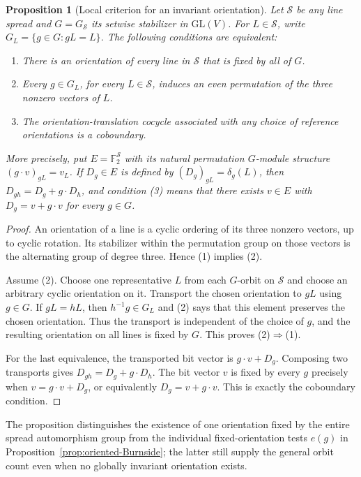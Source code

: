 \documentclass[11pt]{article}
\newtheorem{proposition}[theorem]{Proposition}
\begin{document}
\begin{proposition}[Local criterion for an invariant orientation]
\label{prop:orientation-local}
Let $\mathcal S$ be any line spread and
$G=G_{\mathcal S}$ its setwise stabilizer in $\mathrm{GL}(V)$.
For $L\in\mathcal S$, write $G_L=\{g\in G:gL=L\}$.
The following conditions are equivalent:
\begin{enumerate}
\item There is an orientation of every line in $\mathcal S$
that is fixed by all of $G$.
\item Every $g\in G_L$, for every $L\in\mathcal S$,
induces an even permutation of the three nonzero vectors of $L$.
\item The orientation-translation cocycle associated with any
choice of reference orientations is a coboundary.
\end{enumerate}
More precisely, put $E=\mathbb F_2^{\mathcal S}$ with its natural
permutation $G$-module structure $(g\cdot v)_{gL}=v_L$.
If $D_g\in E$ is defined by $(D_g)_{gL}=\delta_g(L)$,
then $D_{gh}=D_g+g\cdot D_h$, and condition (3) means that
there exists $v\in E$ with $D_g=v+g\cdot v$ for every $g\in G$.
\end{proposition}
\begin{proof}
An orientation of a line is a cyclic ordering of its three
nonzero vectors, up to cyclic rotation. Its stabilizer within
the permutation group on those vectors is the alternating
group of degree three. Hence (1) implies (2).

Assume (2). Choose one representative $L$ from each $G$-orbit
on $\mathcal S$ and choose an arbitrary cyclic orientation on it.
Transport the chosen orientation to $gL$ using $g\in G$.
If $gL=hL$, then $h^{-1}g\in G_L$ and (2) says that this
element preserves the chosen orientation. Thus the transport
is independent of the choice of $g$, and the resulting orientation
on all lines is fixed by $G$. This proves (2)$\Rightarrow$(1).

For the last equivalence, the transported bit vector is
$g\cdot v+D_g$. Composing two transports gives
$D_{gh}=D_g+g\cdot D_h$. The bit vector $v$ is fixed by
every $g$ precisely when $v=g\cdot v+D_g$, or equivalently
$D_g=v+g\cdot v$. This is exactly the coboundary condition.
\end{proof}

The proposition distinguishes the existence of one orientation
fixed by the entire spread automorphism group from the individual
fixed-orientation tests $e(g)$ in
Proposition~\ref{prop:oriented-Burnside}; the latter still supply
the general orbit count even when no globally invariant orientation exists.
\end{document}
